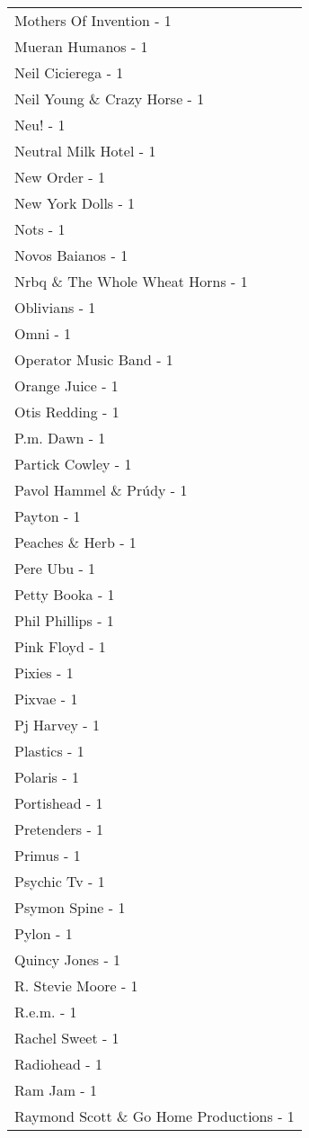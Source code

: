 \documentclass[
]{article}
\begin{document}
\begin{longtable}{l}
Mothers Of Invention - 1 \\ 
Mueran Humanos - 1 \\ 
Neil Cicierega - 1 \\ 
Neil Young \& Crazy Horse - 1 \\ 
Neu! - 1 \\ 
Neutral Milk Hotel - 1 \\ 
New Order - 1 \\ 
New York Dolls - 1 \\ 
Nots - 1 \\ 
Novos Baianos - 1 \\ 
Nrbq \& The Whole Wheat Horns - 1 \\ 
Oblivians - 1 \\ 
Omni - 1 \\ 
Operator Music Band - 1 \\ 
Orange Juice - 1 \\ 
Otis Redding - 1 \\ 
P.m. Dawn - 1 \\ 
Partick Cowley - 1 \\ 
Pavol Hammel \& Prúdy - 1 \\ 
Payton - 1 \\ 
Peaches \& Herb - 1 \\ 
Pere Ubu - 1 \\ 
Petty Booka - 1 \\ 
Phil Phillips - 1 \\ 
Pink Floyd - 1 \\ 
Pixies - 1 \\ 
Pixvae - 1 \\ 
Pj Harvey - 1 \\ 
Plastics - 1 \\ 
Polaris - 1 \\ 
Portishead - 1 \\ 
Pretenders - 1 \\ 
Primus - 1 \\ 
Psychic Tv - 1 \\ 
Psymon Spine - 1 \\ 
Pylon - 1 \\ 
Quincy Jones - 1 \\ 
R. Stevie Moore - 1 \\ 
R.e.m. - 1 \\ 
Rachel Sweet - 1 \\ 
Radiohead - 1 \\ 
Ram Jam - 1 \\ 
Raymond Scott \& Go Home Productions - 1 \\ 

\end{longtable}
\end{document}
